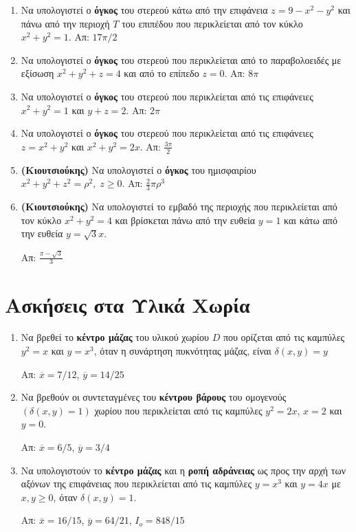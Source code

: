 \begin{enumerate}
  \item Να υπολογιστεί ο \textbf{όγκος} του στερεού κάτω από την επιφάνεια
    $ z= 9- x^{2} -y^{2} $ και πάνω από την περιοχή $T$ του επιπέδου που 
    περικλείεται από τον κύκλο $ x^{2}+y^{2}=1 $.
    \hfill Απ: $ 17 \pi /2 $ 

  \item Να υπολογιστεί ο \textbf{όγκος} του στερεού που περικλείεται από το 
    παραβολοειδές με εξίσωση $ x^{2}+y^{2}+z=4 $ και από το επίπεδο $ z=0 $.
    \hfill Απ: $ 8\pi $ 

  \item Να υπολογιστεί ο \textbf{όγκος} του στερεού που περικλείεται από τις 
    επιφάνειες $ x^{2}+y^{2}=1 $ και $ y+z=2 $.
    \hfill Απ: $ 2 \pi $ 

  \item Να υπολογιστεί ο \textbf{όγκος} του στερεού που περικλείεται από τις 
    επιφάνειες $ z=x^{2}+y^{2} $ και $ x^{2}+y^{2}=2x $.
    \hfill Απ: $ \frac{3 \pi}{2} $ 

  \item \textbf{(Κιουτσιούκης)} Να υπολογιστεί ο 
    \textbf{όγκος} του ημισφαιρίου $ x^{2}+y^{2}+z^{2}=\rho^{2}, \; z \geq 0 $.
    \hfill Απ: $ \frac{2}{3} \pi \rho^{3} $ 

  \item \textbf{(Κιουτσιούκης)} Να υπολογιστεί το εμβαδό της περιοχής που περικλείεται 
    από τον κύκλο $ x^{2}+y^{2}=4 $ και βρίσκεται πάνω από την ευθεία $ y=1 $ και κάτω 
    από την ευθεία $ y= \sqrt{3} x $.

    \hfill Απ: $ \frac{\pi - \sqrt{3}}{3} $ 
\end{enumerate}



\section*{Ασκήσεις στα Υλικά Χωρία}


\begin{enumerate}
  \item Να βρεθεί το \textbf{κέντρο μάζας} του υλικού χωρίου $D$ που ορίζεται από τις 
    καμπύλες $y^{2}=x$ και $y=x^{3}$, όταν η συνάρτηση πυκνότητας μάζας, είναι 
    $\delta(x,y)=y$

  \hfill Απ: $\overline{x}={7}/{12}$, $\overline{y}={14}/{25}$

\item Να βρεθούν οι συντεταγμένες του \textbf{κέντρου βάρους} του ομογενούς 
  $(\delta(x,y)=1)$ χωρίου που περικλείεται από τις καμπύλες $y^{2}=2x$, $x=2$ και $y=0$.

  \hfill Απ: $\overline{x}={6}/{5}$, $\overline{y}={3}/{4}$

\item  Να υπολογιστούν το \textbf{κέντρο μάζας} και η \textbf{ροπή αδράνειας} ως προς 
  την αρχή των αξόνων της επιφάνειας που περικλείεται από τις καμπύλες $y=x^{3}$ και  
  $y=4x$ με $x,y\geq 0$, όταν $\delta(x,y)=1$.

  \hfill Απ: $\overline{x}={16}/{15}$, $\overline{y}={64}/{21}$, 
  $I_{o}={848}/{15}$
\end{enumerate}



